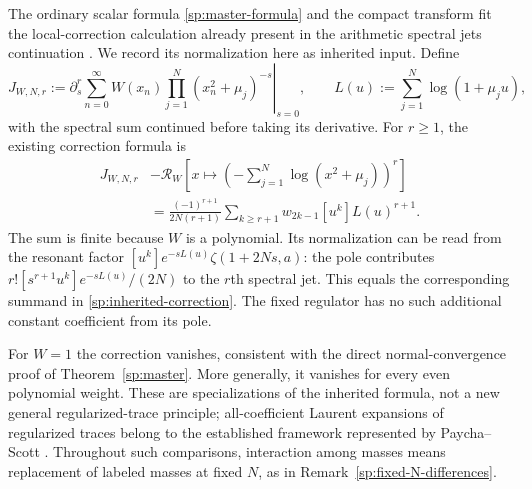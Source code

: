 \begin{remark}
\label{sp:inherited-local-correction}
The ordinary scalar formula \eqref{sp:master-formula} and the
compact transform fit the local-correction calculation already
present in the arithmetic spectral jets continuation
\cite{ProveItArithmeticJets}.  We record its normalization here
as inherited input.  Define
\[
 J_{W,N,r}:=\left.\partial_s^r
       \sum_{n=0}^{\infty}W(x_n)
                     \prod_{j=1}^{N}(x_n^2+\mu_j)^{-s}
                    \right|_{s=0},\qquad
 L(u):=\sum_{j=1}^{N}\log(1+\mu_j u),
\]
with the spectral sum continued before taking its derivative.
For $r\geq1$, the existing correction formula is
\begin{equation}
 \begin{split}
 J_{W,N,r}
 &-\mathcal R_W\left[
        x\longmapsto\left(-\sum_{j=1}^{N}\log(x^2+\mu_j)\right)^r
                   \right]\\
 &=\frac{(-1)^{r+1}}{2N(r+1)}
     \sum_{k\geq r+1}w_{2k-1}[u^k]L(u)^{r+1}.
 \end{split}
 \label{sp:inherited-correction}
\end{equation}
The sum is finite because $W$ is a polynomial.  Its normalization
can be read from the resonant factor
$[u^k]e^{-sL(u)}\zeta(1+2Ns,a)$: the pole contributes
$r![s^{r+1}u^k]e^{-sL(u)}/(2N)$ to the $r$th spectral jet.
This equals the corresponding summand in
\eqref{sp:inherited-correction}.  The fixed regulator has no
such additional constant coefficient from its pole.

For $W=1$ the correction vanishes, consistent with the direct
normal-convergence proof of Theorem~\ref{sp:master}.
More generally, it vanishes for every even polynomial weight.
These are specializations of the inherited formula, not a new
general regularized-trace principle; all-coefficient Laurent
expansions of regularized traces belong to the established
framework represented by Paycha--Scott \cite{PaychaScott}.
Throughout such comparisons, interaction among masses means
replacement of labeled masses at fixed $N$, as in
Remark~\ref{sp:fixed-N-differences}.
\end{remark}

